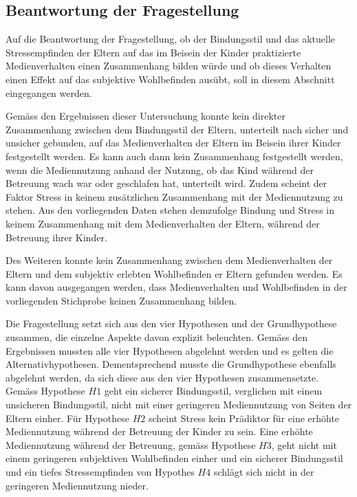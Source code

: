 \subsection{Beantwortung der Fragestellung} \label{sec:BeantwortungFragestellung}
Auf die Beantwortung der Fragestellung, ob der Bindungsstil und das aktuelle Stressempfinden der Eltern auf das im Beisein der Kinder praktizierte Medienverhalten einen Zusammenhang bilden würde und ob dieses Verhalten einen Effekt auf das subjektive Wohlbefinden ausübt, soll in diesem Abschnitt eingegangen werden.

Gemäss den Ergebnissen dieser Untersuchung konnte kein direkter Zusammenhang zwischen dem Bindungsstil der Eltern, unterteilt nach sicher und unsicher gebunden, auf das Medienverhalten der Eltern im Beisein ihrer Kinder festgestellt werden. Es kann auch dann kein Zusammenhang festgestellt werden, wenn die Mediennutzung anhand der Nutzung, ob das Kind während der Betreuung wach war oder geschlafen hat, unterteilt wird.  Zudem scheint der Faktor Stress in keinem zusätzlichen Zusammenhang mit der Mediennutzung zu stehen. Aus den vorliegenden Daten stehen demzufolge Bindung und Stress in keinem Zusammenhang mit dem Medienverhalten der Eltern, während der Betreuung ihrer Kinder.

Des Weiteren konnte kein Zusammenhang zwischen dem Medienverhalten der Eltern und dem subjektiv erlebten Wohlbefinden er Eltern gefunden werden. Es kann davon ausgegangen werden, dass Medienverhalten und Wohlbefinden in der vorliegenden Stichprobe keinen Zusammenhang bilden.

Die Fragestellung setzt sich aus den vier Hypothesen und der Grundhypothese zusammen, die einzelne Aspekte davon explizit beleuchten. Gemäss den Ergebnissen mussten alle vier Hypothesen abgelehnt werden und es gelten die Alternativhypothesen. Dementsprechend musste die Grundhypothese ebenfalls abgelehnt werden, da sich diese aus den vier Hypothesen zusammensetzte. Gemäss Hypothese $H1$ geht ein sicherer Bindungsstil, verglichen mit einem unsicheren Bindungsstil, nicht mit einer geringeren Mediennutzung von Seiten der Eltern einher. Für Hypothese $H2$ scheint Stress kein Prädiktor für eine erhöhte Mediennutzung während der Betreuung der Kinder zu sein. Eine erhöhte Mediennutzung während der Betreuung, gemäss Hypothese $H3$, geht nicht mit einem geringeren subjektiven Wohlbefinden einher und ein sicherer Bindungsstil und ein tiefes Stressempfinden von Hypothes $H4$ schlägt sich nicht in der geringeren Mediennutzung nieder.

